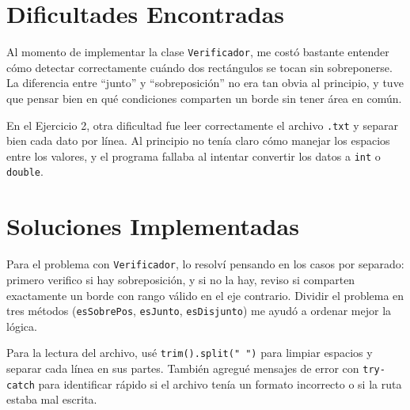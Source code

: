 \documentclass[12pt]{article}
\begin{document}
\newpage
\section{Dificultades Encontradas}
Al momento de implementar la clase \texttt{Verificador}, me costó bastante entender 
cómo detectar correctamente cuándo dos rectángulos se tocan sin sobreponerse. 
La diferencia entre ``junto'' y ``sobreposición'' no era tan obvia al principio, 
y tuve que pensar bien en qué condiciones comparten un borde sin tener área en común.

En el Ejercicio 2, otra dificultad fue leer correctamente el archivo \texttt{.txt} 
y separar bien cada dato por línea. Al principio no tenía claro cómo manejar los 
espacios entre los valores, y el programa fallaba al intentar convertir los datos 
a \texttt{int} o \texttt{double}.

\section{Soluciones Implementadas}
Para el problema con \texttt{Verificador}, lo resolví pensando en los casos por separado: 
primero verifico si hay sobreposición, y si no la hay, reviso si comparten exactamente 
un borde con rango válido en el eje contrario. Dividir el problema en tres métodos 
(\texttt{esSobrePos}, \texttt{esJunto}, \texttt{esDisjunto}) me ayudó a ordenar mejor la lógica.

Para la lectura del archivo, usé \texttt{trim().split(" ")} para limpiar espacios 
y separar cada línea en sus partes. También agregué mensajes de error con 
\texttt{try-catch} para identificar rápido si el archivo tenía un formato incorrecto 
o si la ruta estaba mal escrita.

\newpage
\end{document}
